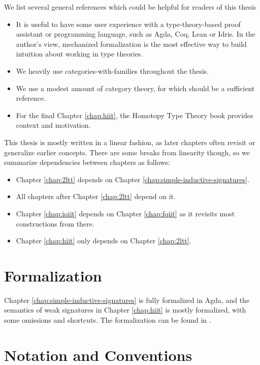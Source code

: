 \documentclass[12pt,a4paper,twoside,openany]{book}
\theoremstyle{remark}
\theoremstyle{definition}
\theoremstyle{theorem}
\begin{document}
We list several general references which could be helpful for readers of
this thesis
\begin{itemize}
\item It is useful to have some user experience with a type-theory-based proof
      assistant or programming language, such as Agda, Coq, Lean or Idris. In the
      author's view, mechanized formalization is the most effective way to build
      intuition about working in type theories.
\item We heavily use categories-with-families \cite{cwfs,Hofmann97syntaxand,Dybjer96internaltype}
      throughout the thesis.
\item We use a modest amount of category theory, for which
      \cite{awodey2010category} should be a sufficient reference.
\item For the final Chapter \ref{chap:hiit}, the Homotopy Type Theory book \cite{hottbook}
      provides context and motivation.
\end{itemize}
This thesis is mostly written in a linear fashion, as later chapters often
revisit or generalize earlier concepts. There are some breaks from linearity
though, so we summarize dependencies between chapters as follows:
\begin{itemize}
  \item Chapter \ref{chap:2ltt} depends on Chapter \ref{chap:simple-inductive-signatures}.
  \item All chapters after Chapter \ref{chap:2ltt} depend on it.
  \item Chapter \ref{chap:iqiit} depends on Chapter \ref{chap:fqiit} as it
        revisits most constructions from there.
  \item Chapter \ref{chap:hiit} only depends on Chapter \ref{chap:2ltt}.
\end{itemize}

\section{Formalization}

Chapter \ref{chap:simple-inductive-signatures} is fully formalized in Agda, and
the semantics of weak signatures in Chapter \ref{chap:hiit} is mostly formalized,
with some omissions and shortcuts. The formalization can be found in \cite{TODO}.

\section{Notation and Conventions}
\end{document}
